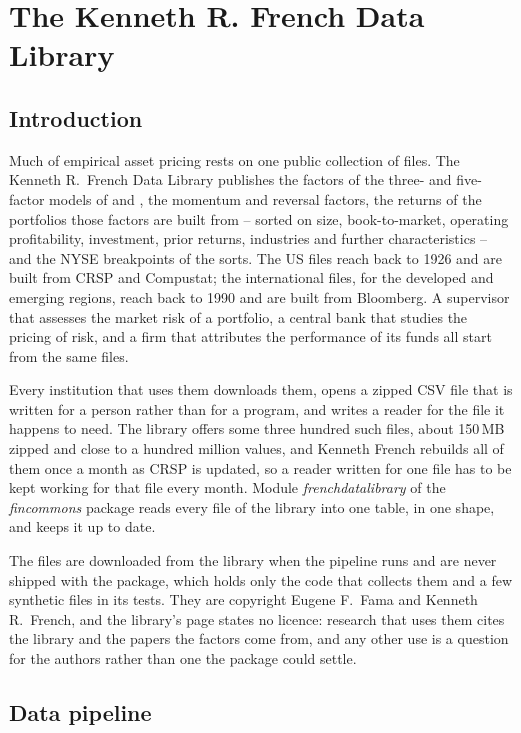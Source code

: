 \chapter{The Kenneth R. French Data Library}\label{ch:frenchdatalibrary}

\section{Introduction}

Much of empirical asset pricing rests on one public collection of files. The Kenneth R.\ French Data Library \parencite{French.2026} publishes the factors of the three- and five-factor models of \textcite{Fama.1993} and \textcite{Fama.2015}, the momentum and reversal factors, the returns of the portfolios those factors are built from -- sorted on size, book-to-market, operating profitability, investment, prior returns, industries and further characteristics -- and the NYSE breakpoints of the sorts. The US files reach back to 1926 and are built from CRSP and Compustat; the international files, for the developed and emerging regions, reach back to 1990 and are built from Bloomberg. A supervisor that assesses the market risk of a portfolio, a central bank that studies the pricing of risk, and a firm that attributes the performance of its funds all start from the same files.

Every institution that uses them downloads them, opens a zipped CSV file that is written for a person rather than for a program, and writes a reader for the file it happens to need. The library offers some three hundred such files, about 150\,MB zipped and close to a hundred million values, and Kenneth French rebuilds all of them once a month as CRSP is updated, so a reader written for one file has to be kept working for that file every month. Module \emph{frenchdatalibrary} of the \emph{fincommons} package reads every file of the library into one table, in one shape, and keeps it up to date.

The files are downloaded from the library when the pipeline runs and are never shipped with the package, which holds only the code that collects them and a few synthetic files in its tests. They are copyright Eugene F.\ Fama and Kenneth R.\ French, and the library's page states no licence: research that uses them cites the library and the papers the factors come from, and any other use is a question for the authors rather than one the package could settle.

\section{Data pipeline}

